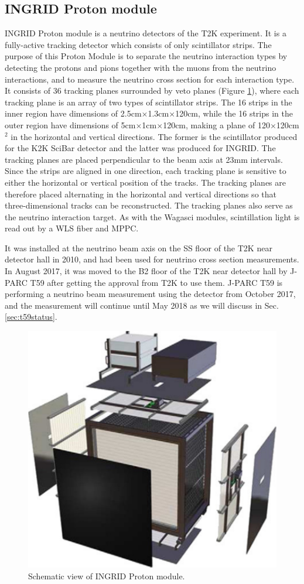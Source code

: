 \subsection{INGRID Proton module}
INGRID Proton module is a neutrino detectors of the T2K experiment.
It is a fully-active tracking detector which consists of only scintillator strips. 
The purpose of this Proton Module is to separate the neutrino interaction types by detecting the protons and pions together with the muons from the neutrino interactions, and to measure the neutrino cross section for each interaction type.
It consists of 36 tracking planes surrounded by veto planes (Figure \ref{fig:proton_module}), where each tracking plane is an array of two types of scintillator strips. 
The 16 strips in the inner region have dimensions of 2.5cm$\times$1.3cm$\times$120cm, while the 16 strips in the outer region have dimensions of 5cm$\times$1cm$\times$120cm, making a plane of 120$\times$120cm$^{2}$ in the horizontal and vertical directions.
The former is the scintillator produced for the K2K SciBar detector \cite{scibar} and the latter was produced for INGRID.
The tracking planes are placed perpendicular to the beam axis at 23mm intervals.
Since the strips are aligned in one direction, each tracking plane is sensitive to either the horizontal or vertical position of the tracks.
The tracking planes are therefore placed alternating in the horizontal and vertical directions so that three-dimensional tracks can be reconstructed.
The tracking planes also serve as the neutrino interaction target.
As with the Wagasci modules, scintillation light is read out by a WLS fiber and MPPC.


It was installed at the neutrino beam axis on the SS floor of the T2K near detector hall in 2010, and had been used for neutrino cross section measurements.
In August 2017, it was moved to the B2 floor of the T2K near detector hall by J-PARC T59 after getting the approval from T2K to use them.
J-PARC T59 is performing a  neutrino beam measurement using the detector from October 2017, and the measurement  will continue until May 2018 as we will discuss in Sec. \ref{sec:t59status}.

\begin{figure}[tbh]
\begin{center}
\includegraphics[width=0.6\linewidth]{fig/proton_module.pdf}
\end{center}
\caption{
Schematic view of INGRID Proton module.
}
\label{fig:proton_module}
\end{figure}
